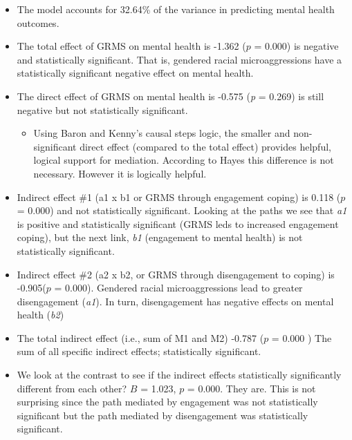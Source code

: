\documentclass[
  english,
]{book}
\providecommand{\tightlist}{%
  \setlength{\itemsep}{0pt}\setlength{\parskip}{0pt}}
\begin{document}
\begin{itemize}
\tightlist
\item
  The model accounts for 32.64\% of the variance in predicting mental health outcomes.
\item
  The total effect of GRMS on mental health is -1.362 (\(p\) = 0.000) is negative and statistically significant. That is, gendered racial microaggressions have a statistically significant negative effect on mental health.
\item
  The direct effect of GRMS on mental health is -0.575 (\emph{p} = 0.269) is still negative but not statistically significant.

  \begin{itemize}
  \tightlist
  \item
    Using Baron and Kenny's \citeyearpar{baron_moderator-mediator_1986} causal steps logic, the smaller and non-significant direct effect (compared to the total effect) provides helpful, logical support for mediation. According to Hayes \citeyearpar{hayes_introduction_2018} this difference is not necessary. However it is logically helpful.
  \end{itemize}
\item
  Indirect effect \#1 (a1 x b1 or GRMS through engagement coping) is 0.118 (\(p\) = 0.000) and not statistically significant. Looking at the paths we see that \emph{a1} is positive and statistically significant (GRMS leds to increased engagement coping), but the next link, \emph{b1} (engagement to mental health) is not statistically significant.
\item
  Indirect effect \#2 (a2 x b2, or GRMS through disengagement to coping) is -0.905(\(p\) = 0.000). Gendered racial microaggressions lead to greater disengagement (\emph{a1}). In turn, disengagement has negative effects on mental health (\emph{b2})
\item
  The total indirect effect (i.e., sum of M1 and M2) -0.787 (\(p\) = 0.000 ) The sum of all specific indirect effects; statistically significant.
\item
  We look at the contrast to see if the indirect effects statistically significantly different from each other? \(B\) = 1.023, \(p\) = 0.000. They are. This is not surprising since the path mediated by engagement was not statistically significant but the path mediated by disengagement was statistically significant.
\end{itemize}
\end{document}

